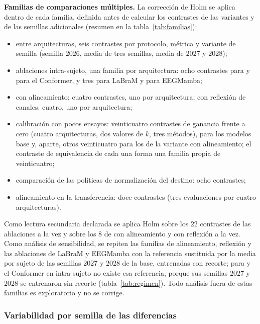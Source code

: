 \textbf{Familias de comparaciones múltiples.} La corrección de Holm se aplica dentro de
cada familia, definida antes de calcular los contrastes de las variantes y de las semillas adicionales (resumen en la tabla~\ref{tab:familias}):

\begin{itemize}
  \item entre arquitecturas, seis contrastes por protocolo, métrica y variante de semilla
  (semilla $2026$, media de tres semillas, media de $2027$ y $2028$);
  \item ablaciones intra-sujeto, una familia por arquitectura: ocho contrastes para
  \eegnet{} y para el Conformer, y tres para LaBraM y para EEGMamba;
  \item \loso{} con alineamiento: cuatro contrastes, uno por arquitectura; \loso{} con
  reflexión de canales: cuatro, uno por arquitectura;
  \item calibración con pocos ensayos: veinticuatro contrastes de ganancia frente a cero
  (cuatro arquitecturas, dos valores de $k$, tres métodos), para los modelos base y,
  aparte, otros veinticuatro para los de la variante con alineamiento; el contraste de
  equivalencia de cada una forma una familia propia de veinticuatro;
  \item comparación de las políticas de normalización del destino: ocho contrastes;
  \item alineamiento en la transferencia: doce contrastes (tres evaluaciones por cuatro arquitecturas).
\end{itemize}

Como lectura secundaria declarada se aplica Holm sobre los $22$ contrastes de las
ablaciones a la vez y sobre los $8$ de \loso{} con alineamiento y con reflexión a la vez. Como
análisis de sensibilidad, se repiten las familias de alineamiento, reflexión y las
ablaciones de LaBraM y EEGMamba con la referencia sustituida por la media por sujeto de las
semillas $2027$ y $2028$ de la base, entrenadas con recorte; para \eegnet{} y el Conformer en
intra-sujeto no existe esa referencia, porque sus semillas $2027$ y $2028$ se entrenaron sin
recorte (tabla~\ref{tab:regimen}). Todo análisis fuera de estas familias es exploratorio y no se
corrige.


\subsubsection{Variabilidad por semilla de las diferencias}
\label{sec:variabilidad-metodo}

